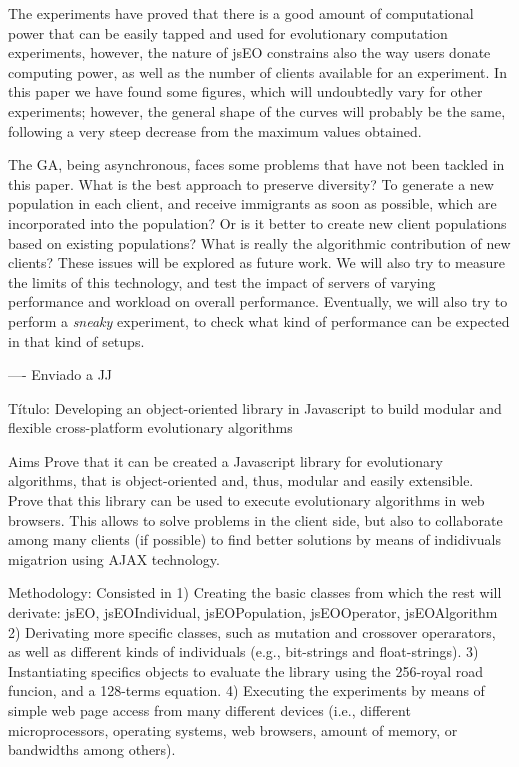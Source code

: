 \documentclass{llncs}
\begin{document}
The experiments have proved that there is a good amount of
computational power that can be easily tapped and used for
evolutionary computation experiments, however, the nature of jsEO
constrains also the way users donate computing power, as well as the
number of clients available for an experiment. In this paper we have
found some figures, which will undoubtedly vary for other experiments;
however, the general shape of the curves will probably be the same,
following a very steep decrease from the maximum values obtained. 

The GA, being asynchronous, faces some problems that have not been
tackled in this paper. What is the best approach to preserve
diversity? To generate a new population in each client, and receive
immigrants as soon as possible, which are incorporated into the
population? Or is it better to create new client populations based on
existing populations? What is really the algorithmic contribution of
new clients? These issues will be explored as future work. 
We will also try to measure the limits of this technology, and test
the impact of servers of varying performance and workload on overall
performance. Eventually, we will also try to perform a {\em sneaky}
experiment, to check what kind of performance can be expected in that
kind of setups. 



----
Enviado a JJ

Título:
Developing an object-oriented library in Javascript to build modular and flexible cross-platform evolutionary algorithms 

Aims
Prove that it can be created a Javascript library for evolutionary algorithms, that is object-oriented and, thus, modular and easily extensible.
Prove that this library can be used to execute evolutionary algorithms in web browsers. This allows to solve problems in the client side, but also to collaborate among many clients (if possible) to find better solutions by means of indidivuals migatrion using AJAX technology.

Methodology:
Consisted in
1) Creating the basic classes from which the rest will derivate: jsEO, jsEOIndividual, jsEOPopulation, jsEOOperator, jsEOAlgorithm
2) Derivating more specific classes, such as mutation and crossover operarators, as well as different kinds of individuals (e.g., bit-strings and float-strings).
3) Instantiating specifics objects to evaluate the library using the 256-royal road funcion, and a 128-terms equation.
4) Executing the experiments by means of simple web page access from many different devices (i.e., different microprocessors, operating systems, web browsers, amount of memory, or bandwidths among others).
\end{document}
